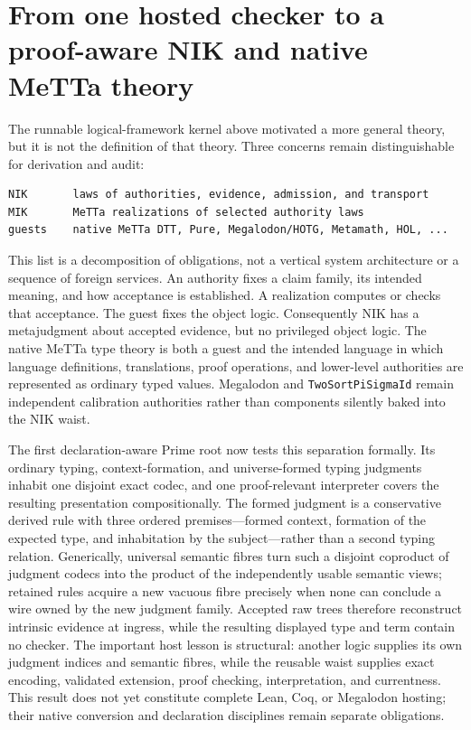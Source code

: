 \documentclass[11pt]{article}
\newcommand{\NIK}{NIK}
\newcommand{\code}[1]{\texttt{#1}}
\begin{document}
\section{From one hosted checker to a proof-aware NIK and native MeTTa theory}
\label{sec:nik-native}

The runnable logical-framework kernel above motivated a more general theory, but
it is not the definition of that theory.  Three concerns remain distinguishable
for derivation and audit:

\begin{lstlisting}
NIK       laws of authorities, evidence, admission, and transport
MIK       MeTTa realizations of selected authority laws
guests    native MeTTa DTT, Pure, Megalodon/HOTG, Metamath, HOL, ...
\end{lstlisting}

This list is a decomposition of obligations, not a vertical system architecture
or a sequence of foreign services.  An authority fixes a claim family, its
intended meaning, and how acceptance is established.  A realization computes or
checks that acceptance.  The guest fixes the object logic.  Consequently \NIK{}
has a metajudgment about accepted evidence, but no privileged object logic.  The
native MeTTa type theory is both a guest and the intended language in which
language definitions, translations, proof operations, and lower-level authorities
are represented as ordinary typed values.  Megalodon and \code{TwoSortPiSigmaId} remain
independent calibration authorities rather than components silently baked into
the \NIK{} waist.

The first declaration-aware Prime root now tests this separation formally.  Its
ordinary typing, context-formation, and universe-formed typing judgments inhabit
one disjoint exact codec, and one proof-relevant interpreter covers the resulting
presentation compositionally.  The formed judgment is a conservative derived
rule with three ordered premises---formed context, formation of the expected
type, and inhabitation by the subject---rather than a second typing relation.
Generically, universal semantic fibres turn such a disjoint coproduct of
judgment codecs into the product of the independently usable semantic views;
retained rules acquire a new vacuous fibre precisely when none can conclude a
wire owned by the new judgment family.
Accepted raw trees therefore reconstruct intrinsic evidence at ingress, while
the resulting displayed type and term contain no checker.  The important host
lesson is structural: another logic supplies its own judgment indices and
semantic fibres, while the reusable waist supplies exact encoding, validated
extension, proof checking, interpretation, and currentness.  This result does
not yet constitute complete Lean, Coq, or Megalodon hosting; their native
conversion and declaration disciplines remain separate obligations.
\end{document}

